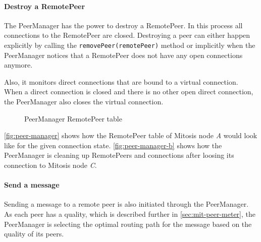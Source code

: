 \paragraph{Destroy a RemotePeer}
The PeerManager has the power to destroy a RemotePeer. In this process all connections to the RemotePeer are closed. 
Destroying a peer can either happen explicitly by calling the \lstinline|removePeer(remotePeer)| method or implicitly when the PeerManager notices that a RemotePeer does not have any open connections anymore.

Also, it monitors direct connections that are bound to a virtual connection. When a direct connection is closed and there is no other open direct connection, the PeerManager also closes the virtual connection.

\begin{figure}
  \centering
    \hspace{1 cm}
	\caption{PeerManager RemotePeer table}
\label{fig:peer-manager}
\end{figure}

\vref{fig:peer-manager} shows how the RemotePeer table of Mitosis node \textit{A} would look like for the given connection state. \vref{fig:peer-manager-b} shows how the PeerManager is cleaning up RemotePeers and connections after loosing its connection to Mitosis node \textit{C}. 

\paragraph{Send a message}
Sending a message to a remote peer is also initiated through the PeerManager. As each peer has a quality, which is described further in \vref{sec:mit-peer-meter}, the PeerManager is selecting the optimal routing path for the message based on the quality of its peers.
